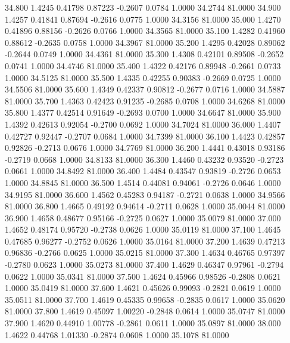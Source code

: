   34.800   1.4245   0.41798   0.87223  -0.2607   0.0784   1.0000  34.2744  81.0000
  34.900   1.4257   0.41841   0.87694  -0.2616   0.0775   1.0000  34.3156  81.0000
  35.000   1.4270   0.41896   0.88156  -0.2626   0.0766   1.0000  34.3565  81.0000
  35.100   1.4282   0.41960   0.88612  -0.2635   0.0758   1.0000  34.3967  81.0000
  35.200   1.4295   0.42028   0.89062  -0.2644   0.0749   1.0000  34.4361  81.0000
  35.300   1.4308   0.42101   0.89508  -0.2652   0.0741   1.0000  34.4746  81.0000
  35.400   1.4322   0.42176   0.89948  -0.2661   0.0733   1.0000  34.5125  81.0000
  35.500   1.4335   0.42255   0.90383  -0.2669   0.0725   1.0000  34.5506  81.0000
  35.600   1.4349   0.42337   0.90812  -0.2677   0.0716   1.0000  34.5887  81.0000
  35.700   1.4363   0.42423   0.91235  -0.2685   0.0708   1.0000  34.6268  81.0000
  35.800   1.4377   0.42514   0.91649  -0.2693   0.0700   1.0000  34.6647  81.0000
  35.900   1.4392   0.42613   0.92054  -0.2700   0.0692   1.0000  34.7024  81.0000
  36.000   1.4407   0.42727   0.92447  -0.2707   0.0684   1.0000  34.7399  81.0000
  36.100   1.4423   0.42857   0.92826  -0.2713   0.0676   1.0000  34.7769  81.0000
  36.200   1.4441   0.43018   0.93186  -0.2719   0.0668   1.0000  34.8133  81.0000
  36.300   1.4460   0.43232   0.93520  -0.2723   0.0661   1.0000  34.8492  81.0000
  36.400   1.4484   0.43547   0.93819  -0.2726   0.0653   1.0000  34.8845  81.0000
  36.500   1.4514   0.44081   0.94061  -0.2726   0.0646   1.0000  34.9195  81.0000
  36.600   1.4562   0.45283   0.94187  -0.2721   0.0638   1.0000  34.9566  81.0000
  36.800   1.4665   0.49192   0.94614  -0.2711   0.0628   1.0000  35.0044  81.0000
  36.900   1.4658   0.48677   0.95166  -0.2725   0.0627   1.0000  35.0079  81.0000
  37.000   1.4652   0.48174   0.95720  -0.2738   0.0626   1.0000  35.0119  81.0000
  37.100   1.4645   0.47685   0.96277  -0.2752   0.0626   1.0000  35.0164  81.0000
  37.200   1.4639   0.47213   0.96836  -0.2766   0.0625   1.0000  35.0215  81.0000
  37.300   1.4634   0.46765   0.97397  -0.2780   0.0623   1.0000  35.0273  81.0000
  37.400   1.4629   0.46347   0.97961  -0.2794   0.0622   1.0000  35.0341  81.0000
  37.500   1.4624   0.45966   0.98526  -0.2808   0.0621   1.0000  35.0419  81.0000
  37.600   1.4621   0.45626   0.99093  -0.2821   0.0619   1.0000  35.0511  81.0000
  37.700   1.4619   0.45335   0.99658  -0.2835   0.0617   1.0000  35.0620  81.0000
  37.800   1.4619   0.45097   1.00220  -0.2848   0.0614   1.0000  35.0747  81.0000
  37.900   1.4620   0.44910   1.00778  -0.2861   0.0611   1.0000  35.0897  81.0000
  38.000   1.4622   0.44768   1.01330  -0.2874   0.0608   1.0000  35.1078  81.0000
